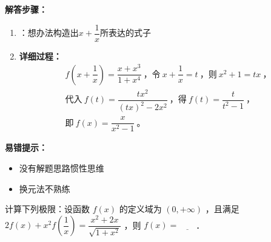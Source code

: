 \documentclass{ctexart}
\begin{document}
\begin{solution}

\textbf{解答步骤：}
\begin{enumerate}
    \item {}：想办法构造出$x+\dfrac{1}{x}$所表达的式子
    
    \item \textbf{详细过程：}
    \[ \begin{aligned}
    &f\left(x+\dfrac{1}{x}\right) = \dfrac{x+x^{3}}{1+x^{4}}\ \text{，令}\ x+\dfrac{1}{x}=t\ \text{，则}\ x^{2}+1=tx\ \text{，}\\
    &\text{代入}\ f(t)=\dfrac{tx^{2}}{(tx)^{2}-2x^{2}}\ \text{，得}\ f(t)=\dfrac{t}{t^{2}-1}\ \text{，}\\
    &\text{即}\ f(x)=\dfrac{x}{x^{2}-1}\ \text{。}
    \end{aligned} \]
    
\end{enumerate}


\textbf{易错提示：}
\begin{itemize}
    \item 没有解题思路惯性思维
    \item 换元法不熟练
\end{itemize}

\end{solution}

\newproblem

\begin{problem}[双x变形式求函数]
计算下列极限：设函数 $f(x)$ 的定义域为 $(0,+\infty)$ ，且满足 $2f(x)+x^2f\left(\dfrac{1}{x}\right)=\dfrac{x^2+2x}{\sqrt{1+x^2}}$ ，则 $f(x)=\underline{\qquad}$．

\end{problem}
\end{document}
